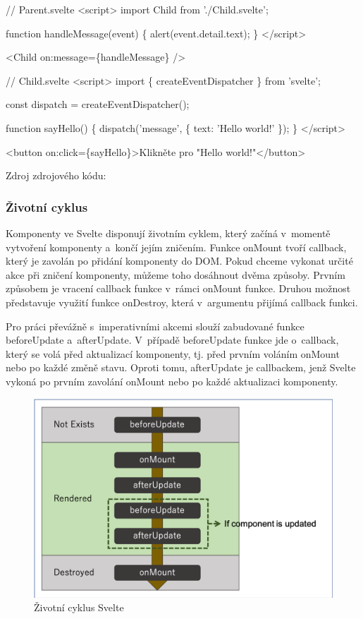 \begin{prog}
// Parent.svelte
<script>
  import Child from './Child.svelte';

  function handleMessage(event) \{
    alert(event.detail.text);
  \}
</script>

<Child on:message=\{handleMessage\} />

// Child.svelte
<script>
  import \{ createEventDispatcher \} from 'svelte';

  const dispatch = createEventDispatcher();

  function sayHello() \{
    dispatch('message', \{
      text: 'Hello world!'
    \});
  \}
</script>

<button on:click=\{sayHello\}>Klikněte pro "Hello world!"</button>
\end{prog}

Zdroj zdrojového kódu: \cite{svelte}

\subsubsection{Životní cyklus}

Komponenty ve Svelte disponují životním cyklem, který začíná v~momentě vytvoření komponenty a~končí jejím zničením. 
Funkce onMount tvoří callback, který je zavolán po přidání komponenty do DOM. Pokud chceme vykonat určité akce při zničení komponenty, můžeme toho dosáhnout dvěma způsoby. 
Prvním způsobem je vracení callback funkce v~rámci onMount funkce. Druhou možnost představuje využití funkce onDestroy, která v~argumentu přijímá callback funkci. 

Pro práci převážně s~imperativními akcemi slouží zabudované funkce beforeUpdate a~afterUpdate. 
V~případě beforeUpdate funkce jde o~callback, který se volá před aktualizací komponenty, tj. před prvním voláním onMount nebo po každé změně stavu. 
Oproti tomu, afterUpdate je callbackem, jenž Svelte vykoná po prvním zavolání onMount nebo po každé aktualizaci komponenty.\cite{sveltehandbook,svelte}

\begin{figure}[htb]
	\centering
		\includegraphics[width=.65\textwidth]{images/sveltelifecycle.png}
	\caption[Životní cyklus Svelte]{Životní cyklus Svelte \cite{sveltelifecycle}}
	\label{fig:sveltelifecycle}
\end{figure}


